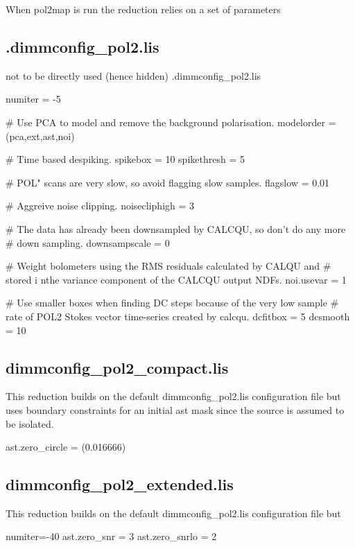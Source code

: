 When pol2map is run the reduction relies on a set of parameters 

\subsection*{.dimmconfig\_pol2.lis}

not to be directly used (hence hidden) .dimmconfig\_pol2.lis

numiter = -5




\begin{terminalv}
#  Use PCA to model and remove the  background polarisation.
   modelorder = (pca,ext,ast,noi)

#  Time based despiking.
   spikebox = 10
   spikethresh = 5

#  POL" scans are very slow, so avoid flagging slow samples.
   flagslow = 0.01

#  Aggreive noise clipping.
   noisecliphigh = 3

#  The data has already been downsampled by CALCQU, so don't  do any more
#  down sampling.
   downsampscale = 0

#  Weight bolometers using the RMS residuals calculated by CALQU and
#  stored i nthe variance component of the CALCQU output NDFs.
   noi.usevar = 1

#  Use smaller boxes when finding DC steps because of the very low sample
#  rate of POL2 Stokes vector time-series created by calcqu.
   dcfitbox = 5
   dcsmooth = 10
\end{terminalv}


\subsection*{dimmconfig\_pol2\_compact.lis}

This reduction builds on the default dimmconfig\_pol2.lis configuration file but uses boundary 
constraints for an initial ast mask since the source is assumed to be isolated.


\begin{terminalv}
   ast.zero_circle = (0.016666)
\end{terminalv}


\subsection*{dimmconfig\_pol2\_extended.lis}


This reduction builds on the default dimmconfig\_pol2.lis configuration file but

\begin{terminalv}
   numiter=-40
   ast.zero_snr = 3
   ast.zero_snrlo = 2
\end{terminalv}


 





